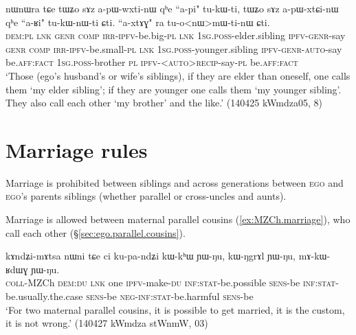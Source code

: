 \begin{exe}
\ex \label{ex:HB.HZ.WB.WZ}
\gll   nɯnɯra tɕe tɯʑo sɤz a-pɯ-wxti-nɯ qʰe ``a-pi" tu-kɯ-ti, tɯʑo sɤz a-pɯ-xtɕi-nɯ qʰe ``a-ʁi" tu-kɯ-nɯ-ti ɕti. ``a-xtɤɣ" ra tu-o<nɯ>mɯ-ti-nɯ ɕti. \\
\textsc{dem}:\textsc{pl} \textsc{lnk} \textsc{genr} \textsc{comp} \textsc{irr}-\textsc{ipfv}-be.big-\textsc{pl} \textsc{lnk} \textsc{1sg}.\textsc{poss}-elder.sibling \textsc{ipfv}-\textsc{genr}-say \textsc{genr} \textsc{comp} \textsc{irr}-\textsc{ipfv}-be.small-\textsc{pl} \textsc{lnk} \textsc{1sg}.\textsc{poss}-younger.sibling \textsc{ipfv}-\textsc{genr}-\textsc{auto}-say be.\textsc{aff}:\textsc{fact} \textsc{1sg}.\textsc{poss}-brother \textsc{pl} \textsc{ipfv}-<\textsc{auto}>\textsc{recip}-say-\textsc{pl} be.\textsc{aff}:\textsc{fact}  \\
\glt `Those (ego's husband's or wife's siblings), if they are elder than oneself, one calls them  `my elder sibling'; if they are younger one calls them  `my younger sibling'. They also call each other `my brother' and the like.' (140425 kWmdza05, 8)
\end{exe}

\section{Marriage rules} \label{sec:marriage.rules}
Marriage is prohibited between siblings and across generations between \textsc{ego} and \textsc{ego}'s parents siblings (whether parallel or cross-uncles and aunts).

Marriage is allowed between maternal parallel cousins (\ref{ex:MZCh.marriage}), who call each other  (§\ref{sec:ego.parallel.cousins}).

\begin{exe}
\ex \label{ex:MZCh.marriage}
\gll kɤndʑi-mɤtsa nɯni tɕe ci ku-pa-ndʑi kɯ-kʰɯ ɲɯ-ŋu, kɯ-ŋgrɤl ɲɯ-ŋu, mɤ-kɯ-ʁdɯɣ ɲɯ-ŋu. \\
\textsc{coll}-MZCh \textsc{dem}:\textsc{du} \textsc{lnk} one \textsc{ipfv}-make-\textsc{du} \textsc{inf}:\textsc{stat}-be.possible \textsc{sens}-be \textsc{inf}:\textsc{stat}-be.usually.the.case \textsc{sens}-be \textsc{neg}-\textsc{inf}:\textsc{stat}-be.harmful \textsc{sens}-be \\
\glt `For two maternal parallel cousins, it is possible to get married, it is the custom, it is not wrong.' (140427 kWmdza stWnmW, 03)
\end{exe}

